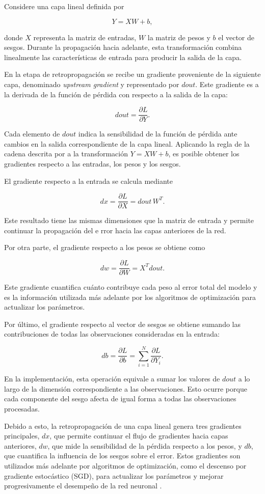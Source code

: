 \documentclass[12pt]{article}
\begin{document}
Considere una capa lineal definida por

$$
Y = XW + b,
$$

donde $X$ representa la matriz de entradas, $W$ la matriz de pesos y $b$ el vector de sesgos. 
Durante la propagación hacia adelante, esta transformación combina linealmente las características de 
entrada para producir la salida de la capa.

En la etapa de retropropagación se recibe un gradiente proveniente de la siguiente capa, 
denominado \textit{upstream gradient} y representado por $dout$. 
Este gradiente es a la derivada de la función de pérdida con respecto a la salida de la capa:

$$
dout=\frac{\partial L}{\partial Y}.
$$

Cada elemento de $dout$ indica la sensibilidad de la función de pérdida ante cambios en 
la salida correspondiente de la capa lineal. Aplicando la regla de la cadena descrita por \textcite{Goodfellow2016} 
a la transformación $Y=XW+b$, es posible obtener los gradientes respecto a las entradas, los pesos y los sesgos.

El gradiente respecto a la entrada se calcula mediante

$$
dx=\frac{\partial L}{\partial X}
=
dout\,W^{T}.
$$

Este resultado tiene las mismas dimensiones que la matriz de entrada y permite continuar la propagación del e
rror hacia las capas anteriores de la red.

Por otra parte, el gradiente respecto a los pesos se obtiene como

$$
dw=\frac{\partial L}{\partial W}
=
X^{T}dout.
$$

Este gradiente cuantifica cuánto contribuye cada peso al error total del modelo y es la información utilizada 
más adelante por los algoritmos de optimización para actualizar los parámetros.

Por último, el gradiente respecto al vector de sesgos se obtiene sumando las contribuciones de todas las observaciones 
consideradas en la entrada:

$$
db=\frac{\partial L}{\partial b}
=
\sum_{i=1}^{N}\frac{\partial L}{\partial Y_i}.
$$

En la implementación, esta operación equivale a sumar los valores de $dout$ a lo largo de la dimensión 
correspondiente a las observaciones. Esto ocurre porque cada componente del sesgo afecta de igual forma
a todas las observaciones procesadas.

Debido a esto, la retropropagación de una capa lineal genera tres gradientes principales, $dx$, que permite continuar 
el flujo de gradientes hacia capas anteriores, $dw$, que mide la sensibilidad de la pérdida respecto a los pesos,
 y $db$, que cuantifica la influencia de los sesgos sobre el error. 
 Estos gradientes son utilizados más adelante por algoritmos de optimización, como el descenso por gradiente estocástico (SGD), 
 para actualizar los parámetros y mejorar progresivamente el desempeño de la red neuronal \parencite{Goodfellow2016}.
\end{document}
